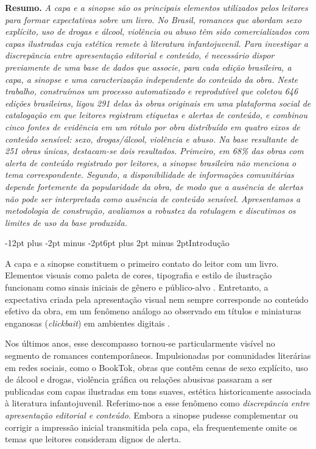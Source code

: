 \documentclass[12pt]{article}
\makeatletter
\renewcommand{\section}{\@startsection{section}{1}{\z@}%
  {-12pt plus -2pt minus -2pt}{6pt plus 2pt minus 2pt}{\normalfont\large\bfseries}}
\newenvironment{resumo}{\centering\begin{minipage}{14.4cm}\small\textbf{Resumo. }\itshape}{\end{minipage}\par\vspace{10pt}}
\makeatother
\begin{document}
\begin{resumo}
A capa e a sinopse são os principais elementos utilizados pelos leitores para formar expectativas sobre um livro. No Brasil, romances que abordam sexo explícito, uso de drogas e álcool, violência ou abuso têm sido comercializados com capas ilustradas cuja estética remete à literatura infantojuvenil. Para investigar a discrepância entre apresentação editorial e conteúdo, é necessário dispor previamente de uma base de dados que associe, para cada edição brasileira, a capa, a sinopse e uma caracterização \emph{independente} do conteúdo da obra. Neste trabalho, construímos um processo automatizado e reprodutível que coletou 646 edições brasileiras, ligou 291 delas às obras originais em uma plataforma social de catalogação em que leitores registram etiquetas e alertas de conteúdo, e combinou cinco fontes de evidência em um rótulo por obra distribuído em quatro eixos de conteúdo sensível: sexo, drogas/álcool, violência e abuso. Na base resultante de 251 obras únicas, destacam-se dois resultados. Primeiro, em 68\% das obras com alerta de conteúdo registrado por leitores, a sinopse brasileira não menciona o tema correspondente. Segundo, a disponibilidade de informações comunitárias depende fortemente da popularidade da obra, de modo que a ausência de alertas não pode ser interpretada como ausência de conteúdo sensível. Apresentamos a metodologia de construção, avaliamos a robustez da rotulagem e discutimos os limites de uso da base produzida.
\end{resumo}

\section{Introdução}
\label{sec:intro}

A capa e a sinopse constituem o primeiro contato do leitor com um livro. Elementos visuais como paleta de cores, tipografia e estilo de ilustração funcionam como sinais iniciais de gênero e público-alvo \cite{iwana2016judging,leenstra2023covers}. Entretanto, a expectativa criada pela apresentação visual nem sempre corresponde ao conteúdo efetivo da obra, em um fenômeno análogo ao observado em títulos e miniaturas enganosas (\emph{clickbait}) em ambientes digitais \cite{yu2024multimodal,naveed2025thumbnailtruth,islam2026ytclickbait21k}.

Nos últimos anos, esse descompasso tornou-se particularmente visível no segmento de romances contemporâneos. Impulsionadas por comunidades literárias em redes sociais, como o BookTok, obras que contêm cenas de sexo explícito, uso de álcool e drogas, violência gráfica ou relações abusivas passaram a ser publicadas com capas ilustradas em tons suaves, estética historicamente associada à literatura infantojuvenil. Referimo-nos a esse fenômeno como \emph{discrepância entre apresentação editorial e conteúdo}. Embora a sinopse pudesse complementar ou corrigir a impressão inicial transmitida pela capa, ela frequentemente omite os temas que leitores consideram dignos de alerta.
\end{document}
